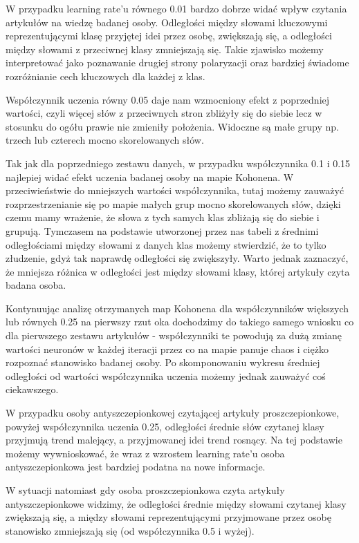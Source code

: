 \documentclass[11pt]{article}
\begin{document}
W przypadku learning rate’u równego 0.01 bardzo dobrze widać wpływ czytania artykułów na wiedzę badanej osoby. Odległości między słowami kluczowymi reprezentującymi klasę przyjętej idei przez osobę, zwiększają się, a odległości między słowami z przeciwnej klasy zmniejszają się. Takie zjawisko możemy interpretować jako poznawanie drugiej strony polaryzacji oraz bardziej świadome rozróżnianie cech kluczowych dla każdej z klas.

Współczynnik uczenia równy 0.05 daje nam wzmocniony efekt z poprzedniej wartości, czyli więcej słów z przeciwnych stron zbliżyły się do siebie lecz w stosunku do ogółu prawie nie zmieniły położenia. Widoczne są małe grupy np. trzech lub czterech mocno skorelowanych słów.

Tak jak dla poprzedniego zestawu danych, w przypadku współczynnika 0.1 i 0.15 najlepiej widać efekt uczenia badanej osoby na mapie Kohonena. W przeciwieństwie do mniejszych wartości współczynnika, tutaj możemy zauważyć rozprzestrzenianie się po mapie małych grup mocno skorelowanych słów, dzięki czemu mamy wrażenie, że słowa z tych samych klas zbliżają się do siebie i grupują. Tymczasem na podstawie utworzonej przez nas tabeli z średnimi odległościami między słowami z danych klas możemy stwierdzić, że to tylko złudzenie, gdyż tak naprawdę odległości się zwiększyły. Warto jednak zaznaczyć, że mniejsza różnica w odległości jest między słowami klasy, której artykuły czyta badana osoba.

Kontynuując analizę otrzymanych map Kohonena dla współczynników większych lub równych 0.25 na pierwszy rzut oka dochodzimy do takiego samego wniosku co dla pierwszego zestawu artykułów - współczynniki te powodują za dużą zmianę wartości neuronów w każdej iteracji przez co na mapie panuje chaos i ciężko rozpoznać stanowisko badanej osoby. Po skomponowaniu wykresu średniej odległości od wartości współczynnika uczenia możemy jednak zauważyć coś ciekawszego. 

W przypadku osoby antyszczepionkowej czytającej artykuły proszczepionkowe, powyżej współczynnika uczenia 0.25, odległości średnie słów czytanej klasy przyjmują trend malejący, a przyjmowanej idei trend rosnący. Na tej podstawie możemy wywnioskować, że wraz z wzrostem learning rate’u osoba antyszczepionkowa jest bardziej podatna na nowe informacje.

W sytuacji natomiast gdy osoba proszczepionkowa czyta artykuły antyszczepionkowe widzimy, że odległości średnie między słowami czytanej klasy zwiększają się, a między słowami reprezentującymi przyjmowane przez osobę stanowisko zmniejszają się (od współczynnika 0.5 i wyżej). 
\end{document}
